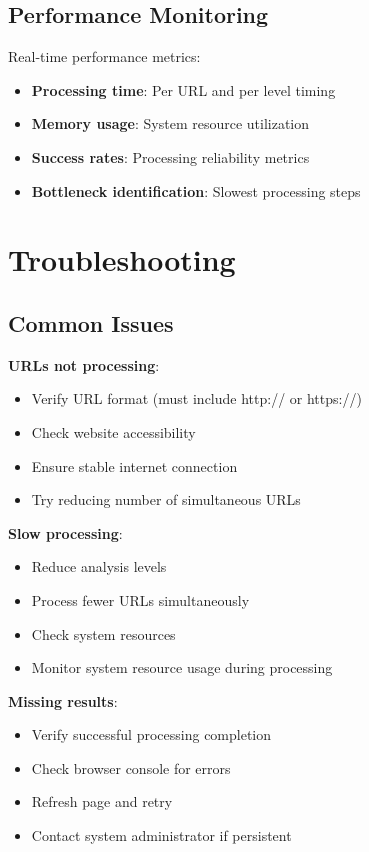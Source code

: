 \subsection{Performance Monitoring}
\label{subsec:performance-monitoring}

Real-time performance metrics:

\begin{itemize}
    \item \textbf{Processing time}: Per URL and per level timing
    \item \textbf{Memory usage}: System resource utilization
    \item \textbf{Success rates}: Processing reliability metrics
    \item \textbf{Bottleneck identification}: Slowest processing steps
\end{itemize}

\section{Troubleshooting}
\label{sec:troubleshooting}

\subsection{Common Issues}
\label{subsec:common-issues}

\textbf{URLs not processing}:
\begin{itemize}
    \item Verify URL format (must include http:// or https://)
    \item Check website accessibility
    \item Ensure stable internet connection
    \item Try reducing number of simultaneous URLs
\end{itemize}

\textbf{Slow processing}:
\begin{itemize}
    \item Reduce analysis levels
    \item Process fewer URLs simultaneously
    \item Check system resources
    \item Monitor system resource usage during processing
\end{itemize}

\textbf{Missing results}:
\begin{itemize}
    \item Verify successful processing completion
    \item Check browser console for errors
    \item Refresh page and retry
    \item Contact system administrator if persistent
\end{itemize}

